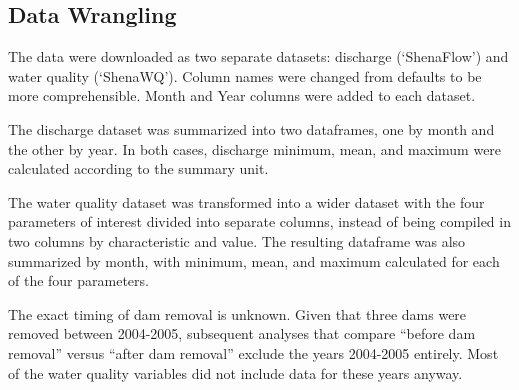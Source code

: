 \documentclass[
  12pt,
]{article}
\begin{document}
\hypertarget{data-wrangling}{%
\subsection{Data Wrangling}\label{data-wrangling}}

The data were downloaded as two separate datasets: discharge
(`ShenaFlow') and water quality (`ShenaWQ'). Column names were changed
from defaults to be more comprehensible. Month and Year columns were
added to each dataset.

The discharge dataset was summarized into two dataframes, one by month
and the other by year. In both cases, discharge minimum, mean, and
maximum were calculated according to the summary unit.

The water quality dataset was transformed into a wider dataset with the
four parameters of interest divided into separate columns, instead of
being compiled in two columns by characteristic and value. The resulting
dataframe was also summarized by month, with minimum, mean, and maximum
calculated for each of the four parameters.

The exact timing of dam removal is unknown. Given that three dams were
removed between 2004-2005, subsequent analyses that compare ``before dam
removal'' versus ``after dam removal'' exclude the years 2004-2005
entirely. Most of the water quality variables did not include data for
these years anyway.
\end{document}

